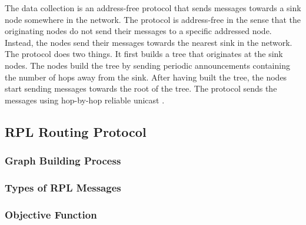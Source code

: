 The data collection is an address-free protocol that sends messages towards a sink node somewhere in the network. The protocol is address-free in the sense that the originating nodes do not send their messages to a specific addressed node. Instead, the nodes send their messages towards the nearest sink in the network. The protocol does two things. It first builds a tree that originates at the sink nodes. The nodes build the tree by sending periodic announcements containing the number of hops away from the sink. After having built the tree, the nodes start sending messages towards the root of the tree. The protocol sends the messages using hop-by-hop reliable unicast \cite{rime}. 

\subsection{RPL Routing Protocol}
\label{rpl}

\subsubsection{Graph Building Process}
\subsubsection{Types of RPL Messages}
\subsubsection{Objective Function}
